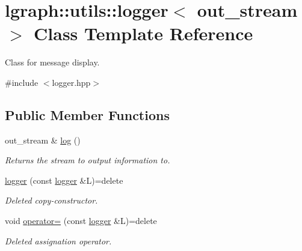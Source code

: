 \hypertarget{classlgraph_1_1utils_1_1logger}{\section{lgraph\-:\-:utils\-:\-:logger$<$ out\-\_\-stream $>$ Class Template Reference}
\label{classlgraph_1_1utils_1_1logger}
}


Class for message display.  




{\ttfamily \#include $<$logger.\-hpp$>$}

\subsection*{Public Member Functions}
\begin{DoxyCompactItemize}
\item 
out\-\_\-stream \& \hyperlink{classlgraph_1_1utils_1_1logger_aa5458017ffc7b65faff47f55a056c2c5}{log} ()
\begin{DoxyCompactList}\small\item\em Returns the stream to output information to. \end{DoxyCompactList}\item 
\hypertarget{classlgraph_1_1utils_1_1logger_ad1e8cb0e83b2d9a90cbcd57e59fcca32}{\hyperlink{classlgraph_1_1utils_1_1logger_ad1e8cb0e83b2d9a90cbcd57e59fcca32}{logger} (const \hyperlink{classlgraph_1_1utils_1_1logger}{logger} \&L)=delete}\label{classlgraph_1_1utils_1_1logger_ad1e8cb0e83b2d9a90cbcd57e59fcca32}

\begin{DoxyCompactList}\small\item\em Deleted copy-\/constructor. \end{DoxyCompactList}\item 
\hypertarget{classlgraph_1_1utils_1_1logger_aabccbc9d1ef5c0eb431eca9f08e4af12}{void \hyperlink{classlgraph_1_1utils_1_1logger_aabccbc9d1ef5c0eb431eca9f08e4af12}{operator=} (const \hyperlink{classlgraph_1_1utils_1_1logger}{logger} \&L)=delete}\label{classlgraph_1_1utils_1_1logger_aabccbc9d1ef5c0eb431eca9f08e4af12}

\begin{DoxyCompactList}\small\item\em Deleted assignation operator. \end{DoxyCompactList}\end{DoxyCompactItemize}
